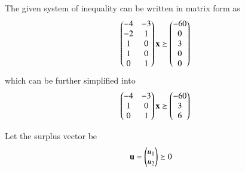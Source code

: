 

The given system of inequality can be written in matrix form as
\begin{align}
    \begin{pmatrix}-4 & -3 \\ -2 & 1 \\ 1 & 0 \\ 1 & 0 \\ 0 & 1\end{pmatrix}\mathbf{x} \succeq \begin{pmatrix}-60\\0\\3\\0\\0\end{pmatrix}
\end{align}
which can be further simplified into 
\begin{align}
    \begin{pmatrix}-4 & -3 \\ 1 & 0 \\ 0 & 1\end{pmatrix}\mathbf{x} \succeq \begin{pmatrix}-60\\3\\6\end{pmatrix}
\end{align}

Let the surplus vector be
\begin{align}
    \mathbf{u} &= \begin{pmatrix}u_1\\u_2\end{pmatrix} \succeq 0
\end{align}

